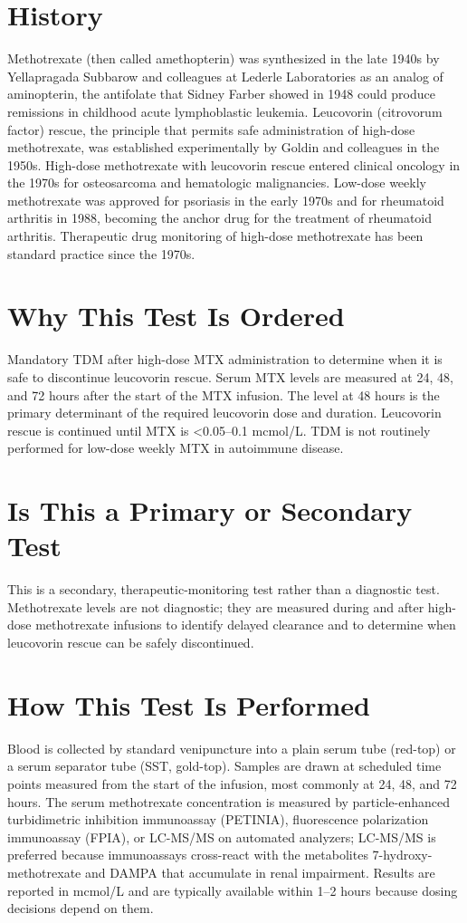 \section*{History}
Methotrexate (then called amethopterin) was synthesized in the late 1940s by Yellapragada Subbarow and colleagues at Lederle Laboratories as an analog of aminopterin, the antifolate that Sidney Farber showed in 1948 could produce remissions in childhood acute lymphoblastic leukemia. Leucovorin (citrovorum factor) rescue, the principle that permits safe administration of high-dose methotrexate, was established experimentally by Goldin and colleagues in the 1950s. High-dose methotrexate with leucovorin rescue entered clinical oncology in the 1970s for osteosarcoma and hematologic malignancies. Low-dose weekly methotrexate was approved for psoriasis in the early 1970s and for rheumatoid arthritis in 1988, becoming the anchor drug for the treatment of rheumatoid arthritis. Therapeutic drug monitoring of high-dose methotrexate has been standard practice since the 1970s.
\section*{Why This Test Is Ordered}
Mandatory TDM after high-dose MTX administration to determine when it is safe to discontinue leucovorin rescue. Serum MTX levels are measured at 24, 48, and 72 hours after the start of the MTX infusion. The level at 48 hours is the primary determinant of the required leucovorin dose and duration. Leucovorin rescue is continued until MTX is <0.05--0.1 mcmol/L. TDM is not routinely performed for low-dose weekly MTX in autoimmune disease.
\section*{Is This a Primary or Secondary Test}
This is a secondary, therapeutic-monitoring test rather than a diagnostic test. Methotrexate levels are not diagnostic; they are measured during and after high-dose methotrexate infusions to identify delayed clearance and to determine when leucovorin rescue can be safely discontinued.
\section*{How This Test Is Performed}
Blood is collected by standard venipuncture into a plain serum tube (red-top) or a serum separator tube (SST, gold-top). Samples are drawn at scheduled time points measured from the start of the infusion, most commonly at 24, 48, and 72 hours. The serum methotrexate concentration is measured by particle-enhanced turbidimetric inhibition immunoassay (PETINIA), fluorescence polarization immunoassay (FPIA), or LC-MS/MS on automated analyzers; LC-MS/MS is preferred because immunoassays cross-react with the metabolites 7-hydroxy-methotrexate and DAMPA that accumulate in renal impairment. Results are reported in mcmol/L and are typically available within 1--2 hours because dosing decisions depend on them.
